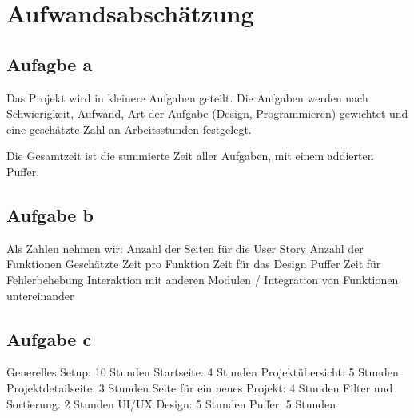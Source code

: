 \documentclass{article}
\begin{document}
\section{Aufwandsabschätzung}

\subsection{Aufagbe a}
Das Projekt wird in kleinere Aufgaben geteilt.
Die Aufgaben werden nach Schwierigkeit, Aufwand, Art der Aufgabe (Design, Programmieren) gewichtet und eine geschätzte Zahl an Arbeitsstunden festgelegt.

Die Gesamtzeit ist die summierte Zeit aller Aufgaben, mit einem addierten Puffer.

\subsection{Aufgabe b}
Als Zahlen nehmen wir: 
Anzahl der Seiten für die User Story
Anzahl der Funktionen
Geschätzte Zeit pro Funktion
Zeit für das Design
Puffer Zeit für Fehlerbehebung
Interaktion mit anderen Modulen / Integration von Funktionen untereinander

\subsection{Aufgabe c}
Generelles Setup: 10 Stunden
Startseite: 4 Stunden
Projektübersicht: 5 Stunden
Projektdetailseite: 3 Stunden
Seite für ein neues Projekt: 4 Stunden
Filter und Sortierung: 2 Stunden
UI/UX Design: 5 Stunden
Puffer: 5 Stunden
\end{document}
